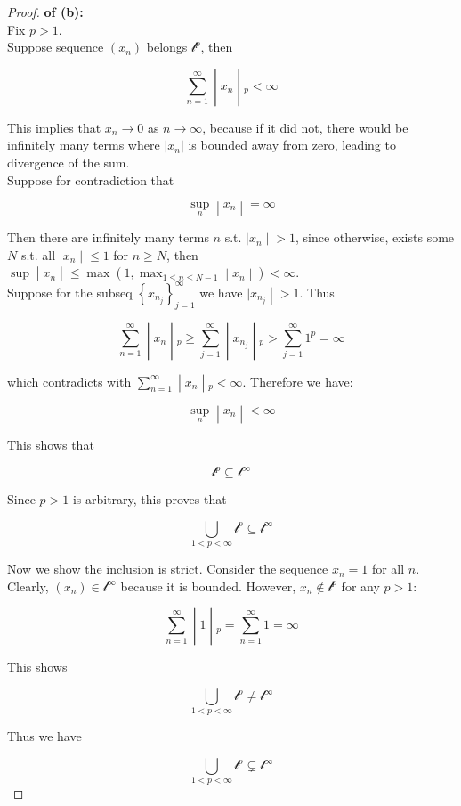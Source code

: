 \begin{proof}

\textbf{of (b):}\\
Fix \(p > 1\).\\
Suppose sequence \((x_{n})\) belongs \(\mathcal{l}^{p}\), then

\[\left. \sum\limits_{n = 1}^{\infty} \middle| x_{n} \middle| {}_{p} < \infty \right.\]

This implies that \(x_{n}\rightarrow 0\) as \(n\rightarrow\infty\), because if it did not, there would be infinitely many terms where \(|x_{n}|\) is bounded away from zero, leading to divergence of the sum.\\
Suppose for contradiction that

\[\left. \sup\limits_{n} \middle| x_{n} \middle| = \infty \right.\]

Then there are infinitely many terms \(n\) s.t. \(\left. |x_{n} \middle| > 1 \right.\), since otherwise, exists some \(N\) s.t. all \(\left. |x_{n} \middle| \leq 1 \right.\) for \(n \geq N\), then \(\left. \sup \middle| x_{n} \middle| \leq \max(1,\max_{1 \leq n \leq N - 1} \middle| x_{n} \middle| ) < \infty \right.\).\\
Suppose for the subseq \(\left\{ x_{n_{j}} \right\}_{j = 1}^{\infty}\) we have \(\left. |x_{n_{j}} \middle| > 1 \right.\). Thus

\[\left. \sum\limits_{n = 1}^{\infty} \middle| x_{n} \middle| {}_{p} \geq \sum\limits_{j = 1}^{\infty} \middle| x_{n_{j}} \middle| {}_{p} > \sum\limits_{j = 1}^{\infty}1^{p} = \infty \right.\]

which contradicts with \(\left. \sum_{n = 1}^{\infty} \middle| x_{n} \middle| {}_{p} < \infty \right.\). Therefore we have:

\[\left. \sup\limits_{n} \middle| x_{n} \middle| < \infty \right.\]

This shows that

\[\mathcal{l}^{p} \subseteq \mathcal{l}^{\infty}\]

Since \(p > 1\) is arbitrary, this proves that

\[\bigcup\limits_{1 < p < \infty}\mathcal{l}^{p} \subseteq \mathcal{l}^{\infty}\]

Now we show the inclusion is strict. Consider the sequence \(x_{n} = 1\) for all \(n\). Clearly, \((x_{n}) \in \mathcal{l}^{\infty}\) because it is bounded. However, \(x_{n} \notin \mathcal{l}^{p}\) for any \(p > 1\):

\[\left. \sum\limits_{n = 1}^{\infty} \middle| 1 \middle| {}_{p} = \sum\limits_{n = 1}^{\infty}1 = \infty \right.\]

This shows

\[\bigcup\limits_{1 < p < \infty}\mathcal{l}^{p} \neq \mathcal{l}^{\infty}\]

Thus we have

\[\bigcup\limits_{1 < p < \infty}\mathcal{l}^{p} \subsetneq \mathcal{l}^{\infty}\]

\end{proof}

